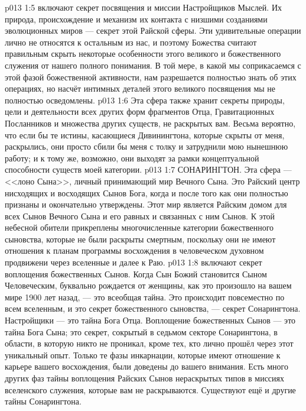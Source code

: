 \vs p013 1:5 \pc {} включают секрет посвящения и миссии Настройщиков Мыслей. Их природа, происхождение и механизм их контакта с низшими созданиями эволюционных миров --- секрет этой Райской сферы. Эти удивительные операции лично не относятся к остальным из нас, и поэтому Божества считают правильным скрыть некоторые особенности этого великого и божественного служения от нашего полного понимания. В той мере, в какой мы соприкасаемся с этой фазой божественной активности, нам разрешается полностью знать об этих операциях, но насчёт интимных деталей этого великого посвящения мы не полностью осведомлены.
\vs p013 1:6 Эта сфера также хранит секреты природы, цели и деятельности всех других форм фрагментов Отца, Гравитационных Посланников и множества других существ, не раскрытых вам. Весьма вероятно, что если бы те истины, касающиеся Дивинингтона, которые скрыты от меня, раскрылись, они просто сбили бы меня с толку и затруднили мою нынешнюю работу; и к тому же, возможно, они выходят за рамки концептуальной способности существ моей категории.
\vs p013 1:7 СОНАРИНГТОН. Эта сфера --- <<лоно Сына>>, личный принимающий мир Вечного Сына. Это Райский центр нисходящих и восходящих Сынов Бога, когда и после того как они полностью признаны и окончательно утверждены. Этот мир является Райским домом для всех Сынов Вечного Сына и его равных и связанных с ним Сынов. К этой небесной обители прикреплены многочисленные категории божественного сыновства, которые не были раскрыты смертным, поскольку они не имеют отношения к планам программы восхождения в человеческом духовном продвижени через вселенные и далее к Раю.
\vs p013 1:8 \pc {} включают секрет воплощения божественных Сынов. Когда Сын Божий становится Сыном Человеческим, буквально рождается от женщины, как это произошло на вашем мире 1900 лет назад, --- это всеобщая тайна. Это происходит повсеместно по всем вселенным, и это секрет божественного сыновства, --- секрет Сонарингтона. Настройщики --- это тайна Бога Отца. Воплощение божественных Сынов --- это тайна Бога Сына; это секрет, сокрытый в седьмом секторе Сонарингтона, в области, в которую никто не проникал, кроме тех, кто лично прошёл через этот уникальный опыт. Только те фазы инкарнации, которые имеют отношение к карьере вашего восхождения, были доведены до вашего внимания. Есть много других фаз тайны воплощения Райских Сынов нераскрытых типов в миссиях вселенского служения, которые вам не раскрываются. Существуют ещё и другие тайны Сонарингтона.
